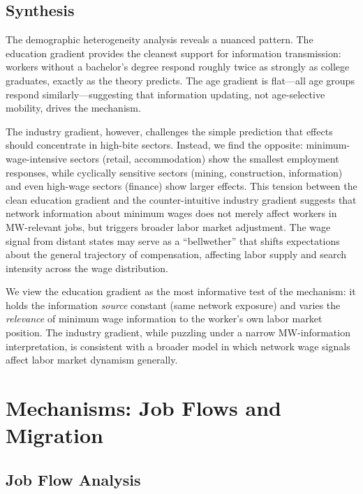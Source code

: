 \documentclass[12pt]{article}
\begin{document}
\subsection{Synthesis}

The demographic heterogeneity analysis reveals a nuanced pattern. The education gradient provides the cleanest support for information transmission: workers without a bachelor's degree respond roughly twice as strongly as college graduates, exactly as the theory predicts. The age gradient is flat---all age groups respond similarly---suggesting that information updating, not age-selective mobility, drives the mechanism.

The industry gradient, however, challenges the simple prediction that effects should concentrate in high-bite sectors. Instead, we find the opposite: minimum-wage-intensive sectors (retail, accommodation) show the smallest employment responses, while cyclically sensitive sectors (mining, construction, information) and even high-wage sectors (finance) show larger effects. This tension between the clean education gradient and the counter-intuitive industry gradient suggests that network information about minimum wages does not merely affect workers in MW-relevant jobs, but triggers broader labor market adjustment. The wage signal from distant states may serve as a ``bellwether'' that shifts expectations about the general trajectory of compensation, affecting labor supply and search intensity across the wage distribution.

We view the education gradient as the most informative test of the mechanism: it holds the information \textit{source} constant (same network exposure) and varies the \textit{relevance} of minimum wage information to the worker's own labor market position. The industry gradient, while puzzling under a narrow MW-information interpretation, is consistent with a broader model in which network wage signals affect labor market dynamism generally.

\section{Mechanisms: Job Flows and Migration}
\label{sec:mechanisms}

\subsection{Job Flow Analysis}
\end{document}
